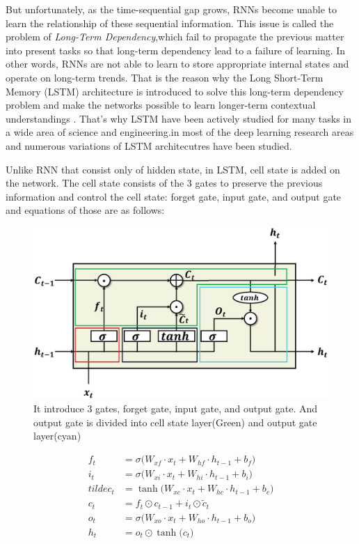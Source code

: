 \documentclass{ieeeaccess}
\begin{document}
But unfortunately, as the time-sequential gap grows, RNNs become unable to learn the relationship of these sequential information. This issue is called the problem of \textit{Long-Term Dependency},which fail to propagate the previous matter into present tasks so that long-term dependency lead to a failure of learning. In other words, RNNs are not able to learn to store appropriate internal states and operate on long-term trends. That is the reason why the Long Short-Term Memory (LSTM) architecture is introduced to solve this long-term dependency problem and make the networks possible to learn longer-term contextual
understandings \cite{hochreiter1997long}. That's why LSTM have been actively studied for many tasks in a wide area of science and engineering.in most of the deep learning research areas and numerous variations of LSTM architecutres have been studied.

Unlike RNN that consist only of hidden state, in LSTM, cell state is added on the network. The cell state consists of the 3 gates to preserve the previous information and control the cell state: forget gate, input gate, and output gate and equations of those are as follows:

\begin{figure}[h]
	\centering
	\includegraphics[width=.4\textwidth]{image/basic_LSTM}
	\caption{It introduce 3 gates, forget gate, input gate, and output gate. And output gate is divided into cell state layer(Green) and output gate layer(cyan) 
	}
	\label{fig:basic_lstm}
\end{figure}

\begin{align}
f_{t} & =\sigma\big(W_{xf}\cdot x_{t}+W_{hf}\cdot h_{t-1}+b_{f}\big)\label{eq:forget}\\
i_{t} & =\sigma\big(W_{xi}\cdot x_{t}+W_{hi}\cdot h_{t-1}+b_{i}\big)\label{eq:input}\\
tilde{c}_{t} & = \tanh\big(W_{xc}\cdot x_{t}+W_{hc}\cdot h_{t-1}+b_{c}\big)\label{eq:new_cell}\\
c_{t} & =f_{t}\odot c_{t-1}+i_{t}\odot\tilde{c}_{t}\label{eq:update}\\
o_{t} & =\sigma\big(W_{xo}\cdot x_{t}+W_{ho}\cdot h_{t-1}+b_{o}\big)\label{eq:output}\\
h_{t} & =o_{t}\odot \tanh\big(c_{t}\big)\label{eq:hidden}
\end{align}
\end{document}
